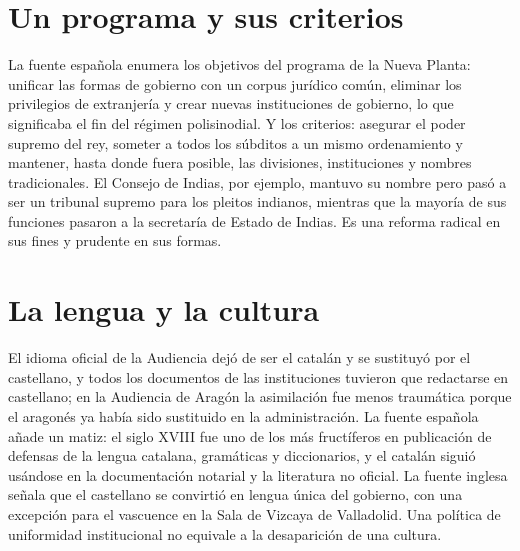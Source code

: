\documentclass{book}
\begin{document}

\section{Un programa y sus criterios}

La fuente española enumera los objetivos del programa de la Nueva Planta: unificar las formas de gobierno con un corpus jurídico común, eliminar los privilegios de extranjería y crear nuevas instituciones de gobierno, lo que significaba el fin del régimen polisinodial. Y los criterios: asegurar el poder supremo del rey, someter a todos los súbditos a un mismo ordenamiento y mantener, hasta donde fuera posible, las divisiones, instituciones y nombres tradicionales. El Consejo de Indias, por ejemplo, mantuvo su nombre pero pasó a ser un tribunal supremo para los pleitos indianos, mientras que la mayoría de sus funciones pasaron a la secretaría de Estado de Indias. Es una reforma radical en sus fines y prudente en sus formas.


\section{La lengua y la cultura}

El idioma oficial de la Audiencia dejó de ser el catalán y se sustituyó por el castellano, y todos los documentos de las instituciones tuvieron que redactarse en castellano; en la Audiencia de Aragón la asimilación fue menos traumática porque el aragonés ya había sido sustituido en la administración. La fuente española añade un matiz: el siglo XVIII fue uno de los más fructíferos en publicación de defensas de la lengua catalana, gramáticas y diccionarios, y el catalán siguió usándose en la documentación notarial y la literatura no oficial. La fuente inglesa señala que el castellano se convirtió en lengua única del gobierno, con una excepción para el vascuence en la Sala de Vizcaya de Valladolid. Una política de uniformidad institucional no equivale a la desaparición de una cultura.

\end{document}
